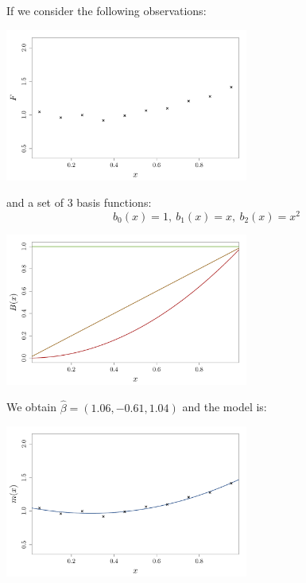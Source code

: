 \begin{frame}{}
\begin{example}
	If we consider the following observations:
\begin{center}
  \includegraphics[height=5cm]{1_stat_models/figures/R/linreg_0}
\end{center}
\end{example}
\end{frame}

\begin{frame}{}
\begin{example}
	and a set of 3 basis functions:
	 $$b_0(x)=1,\ b_1(x)=x,\ b_2(x)=x^2$$
\begin{center}
  \includegraphics[height=5cm]{1_stat_models/figures/R/linreg_1}
\end{center}
\end{example}
\end{frame}

\begin{frame}{}
\begin{example}
We obtain $\hat{\beta} = (1.06,-0.61,1.04)$ and the model is:
\begin{center}
  \includegraphics[height=5cm]{1_stat_models/figures/R/linreg_2}
\end{center}
\end{example}
\end{frame}

